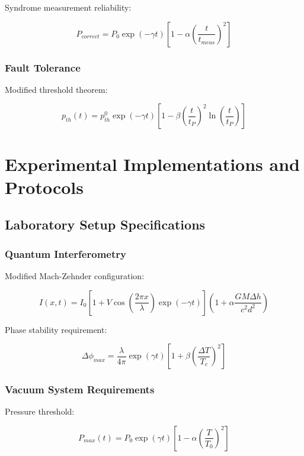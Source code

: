 \documentclass[12pt]{article}
\theoremstyle{plain}
\theoremstyle{definition}
\theoremstyle{remark}
\begin{document}
Syndrome measurement reliability:

\begin{equation}
P_{correct} = P_0\exp(-\gamma t)\left[1 - \alpha\left(\frac{t}{t_{meas}}\right)^2\right]
\end{equation}

\subsubsection{Fault Tolerance}

Modified threshold theorem:

\begin{equation}
p_{th}(t) = p_{th}^0\exp(-\gamma t)\left[1 - \beta\left(\frac{t}{t_P}\right)^2\ln\left(\frac{t}{t_P}\right)\right]
\end{equation}
\section{Experimental Implementations and Protocols}

\subsection{Laboratory Setup Specifications}

\subsubsection{Quantum Interferometry}

Modified Mach-Zehnder configuration:

\begin{equation}
I(x,t) = I_0\left[1 + V\cos\left(\frac{2\pi x}{\lambda}\right)\exp(-\gamma t)\right]\left(1 + \alpha\frac{GM\Delta h}{c^2d^2}\right)
\end{equation}

Phase stability requirement:

\begin{equation}
\Delta\phi_{max} = \frac{\lambda}{4\pi}\exp(\gamma t)\left[1 + \beta\left(\frac{\Delta T}{T_c}\right)^2\right]
\end{equation}

\subsubsection{Vacuum System Requirements}

Pressure threshold:

\begin{equation}
P_{max}(t) = P_0\exp(\gamma t)\left[1 - \alpha\left(\frac{T}{T_0}\right)^2\right]
\end{equation}
\end{document}
